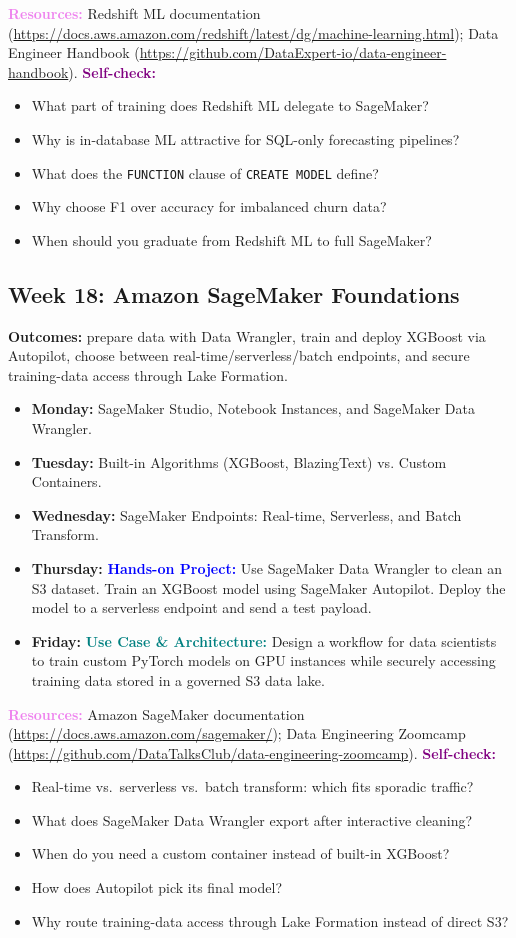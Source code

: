 \documentclass[11pt, a4paper]{article}
\newcommand{\project}[1]{\vspace{1mm}\noindent\textbf{\textcolor{blue}{Hands-on Project:}} #1}
\newcommand{\usecase}[1]{\vspace{1mm}\noindent\textbf{\textcolor{teal}{Use Case \& Architecture:}} #1}
\newcommand{\dayitem}[2]{\item \textbf{#1:} #2}
\newcommand{\resources}[1]{\vspace{1mm}\noindent\textbf{\textcolor{violet}{Resources:}} #1}
\newcommand{\selfcheck}[1]{\vspace{1mm}\noindent\textbf{\textcolor{purple}{Self-check:}} #1}
\begin{document}
\resources{Redshift ML documentation (\url{https://docs.aws.amazon.com/redshift/latest/dg/machine-learning.html}); Data Engineer Handbook (\url{https://github.com/DataExpert-io/data-engineer-handbook}).}
\selfcheck{\begin{itemize}[label=-, leftmargin=1.5em, itemsep=0pt]
    \item What part of training does Redshift ML delegate to SageMaker?
    \item Why is in-database ML attractive for SQL-only forecasting pipelines?
    \item What does the \texttt{FUNCTION} clause of \texttt{CREATE MODEL} define?
    \item Why choose F1 over accuracy for imbalanced churn data?
    \item When should you graduate from Redshift ML to full SageMaker?
\end{itemize}}

\subsection*{Week 18: Amazon SageMaker Foundations}
\par\noindent\textbf{Outcomes:} prepare data with Data Wrangler, train and deploy XGBoost via Autopilot, choose between real-time/serverless/batch endpoints, and secure training-data access through Lake Formation.
\begin{itemize}[label=-]
    \dayitem{Monday}{SageMaker Studio, Notebook Instances, and SageMaker Data Wrangler.}
    \dayitem{Tuesday}{Built-in Algorithms (XGBoost, BlazingText) vs. Custom Containers.}
    \dayitem{Wednesday}{SageMaker Endpoints: Real-time, Serverless, and Batch Transform.}
    \dayitem{Thursday}{\project{Use SageMaker Data Wrangler to clean an S3 dataset. Train an XGBoost model using SageMaker Autopilot. Deploy the model to a serverless endpoint and send a test payload.}}
    \dayitem{Friday}{\usecase{Design a workflow for data scientists to train custom PyTorch models on GPU instances while securely accessing training data stored in a governed S3 data lake.}}
\end{itemize}
\resources{Amazon SageMaker documentation (\url{https://docs.aws.amazon.com/sagemaker/}); Data Engineering Zoomcamp (\url{https://github.com/DataTalksClub/data-engineering-zoomcamp}).}
\selfcheck{\begin{itemize}[label=-, leftmargin=1.5em, itemsep=0pt]
    \item Real-time vs.\ serverless vs.\ batch transform: which fits sporadic traffic?
    \item What does SageMaker Data Wrangler export after interactive cleaning?
    \item When do you need a custom container instead of built-in XGBoost?
    \item How does Autopilot pick its final model?
    \item Why route training-data access through Lake Formation instead of direct S3?
\end{itemize}}
\end{document}

